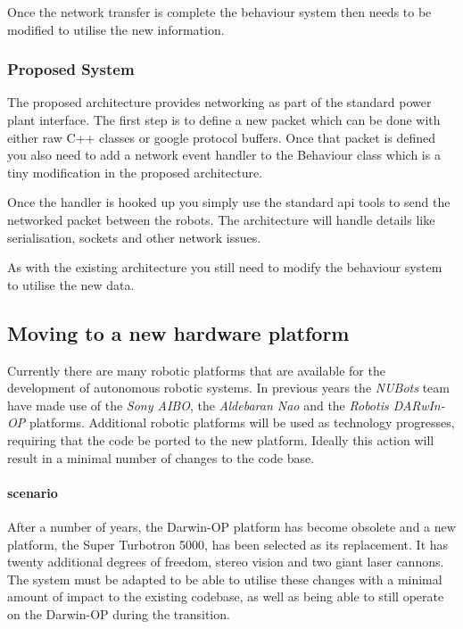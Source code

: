 \documentclass[english,12pt]{scrartcl}
\begin{document}
				Once the network transfer is complete the behaviour system then needs to be modified to utilise the new information.
			\subsubsection{Proposed System}
				The proposed architecture provides networking as part of the standard power plant interface.
				The first step is to define a new packet which can be done with either raw C++ classes or 
				google protocol buffers. Once that packet is defined you also need to add a network event handler
				to the Behaviour class which is a tiny modification in the proposed architecture.
				
				Once the handler is hooked up you simply use the standard api tools to send the networked packet
				between the robots. The architecture will handle details like serialisation, sockets and other network
				issues.
				
				As with the existing architecture you still need to modify the behaviour system to utilise the new data.

		\subsection{Moving to a new hardware platform}
			Currently there are many robotic platforms that are available for the development of autonomous
			robotic systems. In previous years the \emph{NUBots} team have made use of the \emph{Sony AIBO},
			the \emph{Aldebaran Nao} and the \emph{Robotis DARwIn-OP} platforms. Additional robotic platforms will be used as technology progresses, requiring that the code be ported to the new platform.
			Ideally this action will result in a minimal number of changes to the code base.

			\paragraph{scenario} After a number of years, the Darwin-OP platform has become obsolete and a new platform, the Super Turbotron 5000, has been selected as its replacement. It has twenty
			additional degrees of freedom, stereo vision and two giant laser cannons. The system must be
			adapted to be able to utilise these changes with a minimal amount of impact to the existing codebase, as well as being able to still operate on the Darwin-OP during the transition.
\end{document}
